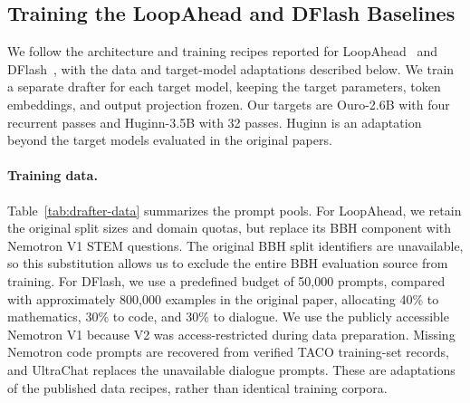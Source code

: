 
\subsection{Training the LoopAhead and DFlash Baselines}
\label{app:drafter-training}

We follow the architecture and training recipes reported for
LoopAhead~\cite{liu2026loopahead} and DFlash~\cite{chen2026dflash},
with the data and target-model adaptations described below.
We train a separate drafter for each target model, keeping the target
parameters, token embeddings, and output projection frozen.
Our targets are Ouro-2.6B with four recurrent passes and Huginn-3.5B
with 32 passes. Huginn is an adaptation beyond the target models
evaluated in the original papers.

\paragraph{Training data.}
Table~\ref{tab:drafter-data} summarizes the prompt pools.
For LoopAhead, we retain the original split sizes and domain quotas,
but replace its BBH component with Nemotron V1 STEM questions.
The original BBH split identifiers are unavailable, so this substitution
allows us to exclude the entire BBH evaluation source from training.
For DFlash, we use a predefined budget of 50,000 prompts, compared with
approximately 800,000 examples in the original paper, allocating 40\%
to mathematics, 30\% to code, and 30\% to dialogue.
We use the publicly accessible Nemotron V1 because V2 was access-restricted
during data preparation. Missing Nemotron code prompts are recovered
from verified TACO training-set records, and UltraChat replaces the
unavailable dialogue prompts. These are adaptations of the published
data recipes, rather than identical training corpora.

